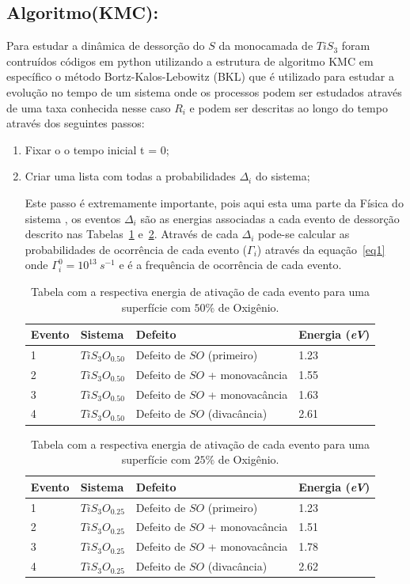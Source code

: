 \documentclass[11pt]{article}
\begin{document}
\subsection{Algoritmo(KMC):}
\label{sec:orgaa56274}
Para estudar a dinâmica de dessorção do \(S\) da monocamada de \(TiS_3\) foram contruídos códigos em python utilizando a estrutura de algoritmo KMC em específico o método Bortz-Kalos-Lebowitz (BKL) que é utilizado para estudar a evolução no tempo de um sistema onde os processos podem ser estudados através de uma taxa conhecida nesse caso \(R_i\) e podem ser descritas ao longo do tempo através dos seguintes passos:
\begin{enumerate}
\item Fixar o o tempo inicial t = 0;
\item Criar uma lista com todas a probabilidades $\Delta_i$ do sistema;

    Este passo é extremamente importante, pois aqui esta uma parte da Física do sistema , os eventos $\Delta_i$ são as energias associadas a cada evento de dessorção descrito nas Tabelas~\ref{t1} e~\ref{t2}. Através de cada $\Delta_i$ pode-se calcular as probabilidades de ocorrência de cada evento ($\Gamma_i$) através da equação~\ref{eq1} onde $\Gamma_{i}^{0}= 10^{13}~s^{-1}$ e é a frequência de ocorrência de cada evento.
\begin{table}[ht]
\centering
\begin{tabular}{| l| l| l| l|}
\hline
\textbf{Evento} & \textbf{Sistema} & \textbf{Defeito} & \textbf{Energia (\textit{eV})}\\
\hline
\hline
1 & $TiS_3O_{0.50}$ & Defeito de $SO$ (primeiro)   & 1.23 \\
\hline
2 & $TiS_3O_{0.50}$ & Defeito de $SO$ + monovacância & 1.55 \\
\hline
3 & $TiS_3O_{0.50}$ & Defeito de $SO$ + monovacância& 1.63 \\
\hline
4 & $TiS_3O_{0.50}$ &  Defeito de $SO$ (divacância)& 2.61 \\
\hline
\end{tabular}
\caption{Tabela com a respectiva energia de ativação de cada evento para uma superfície com $50\%$ de Oxigênio.}
\label{t1}
\end{table}

\begin{table}[ht]
\centering
\begin{tabular}{| l| l| l| l|}
\hline
\textbf{Evento} & \textbf{Sistema} & \textbf{Defeito} & \textbf{Energia (\textit{eV})}\\
\hline
\hline
1 & $TiS_3O_{0.25}$ & Defeito de $SO$ (primeiro)   & 1.23 \\
\hline
2 & $TiS_3O_{0.25}$ & Defeito de $SO$ + monovacância & 1.51 \\
\hline
3 & $TiS_3O_{0.25}$ & Defeito de $SO$ + monovacância& 1.78 \\
\hline
4 & $TiS_3O_{0.25}$ &  Defeito de $SO$ (divacância)& 2.62 \\
\hline
\end{tabular}
\caption{Tabela com a respectiva energia de ativação de cada evento para uma superfície com $25\%$ de Oxigênio.}
\label{t2}
\end{table}




\end{enumerate}
\end{document}
